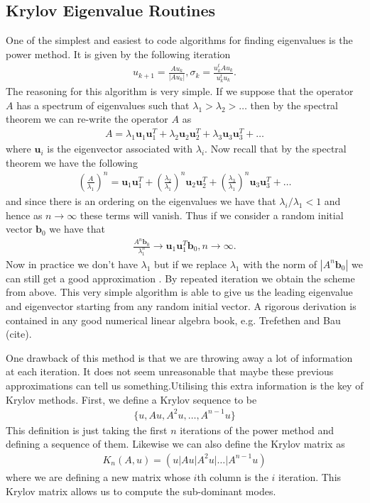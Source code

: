 \subsection{Krylov Eigenvalue Routines}
One of the simplest and easiest to code algorithms for finding eigenvalues is the power method. It is given by the following iteration \cite{MeyerLinAlg}
\begin{align}
u_{k+1}=\frac{Au_{k}}{|Au_{k}|}, \sigma_{k}=\frac{u_{k}^{t}Au_{k}}{u_{k}^{t}u_{k}}.
\end{align}
The reasoning for this algorithm is very simple. If we suppose that the operator $A$ has a spectrum of eigenvalues such that $\lambda_{1} > \lambda_{2} > \ldots $ then by the spectral theorem we can re-write the operator $A$ as
\begin{align}
A = \lambda_{1}\bm{u}_{1}\bm{u}_{1}^{T} + \lambda_{2}\bm{u}_{2}\bm{u}_{2}^{T} + \lambda_{3}\bm{u}_{3}\bm{u}_{3}^{T} + \ldots 
\end{align} 
where $\bm{u}_{i}$ is the eigenvector associated with $\lambda_{i}$. Now recall that by the spectral theorem we have the following \cite{MeyerLinAlg}
\begin{align}
\left(\frac{A}{\lambda_{1}}\right)^{n} = \bm{u}_{1}\bm{u}_{1}^{T} + \left(\frac{\lambda_{2}}{\lambda_{1}}\right)^{n}\bm{u}_{2}\bm{u}_{2}^{T} + \left(\frac{\lambda_{3}}{\lambda_{1}}\right)^{n}\bm{u}_{3}\bm{u}_{3}^{T} + \ldots 
\end{align}
and since there is an ordering on the eigenvalues we have that $\lambda_{i}/\lambda_{1}<1$ and hence as $n\rightarrow\infty$ these terms will vanish. Thus if we consider a random initial vector $\bm{b}_{0}$ we have that 
\begin{align}
\frac{A^{n}\bm{b}_{0}}{\lambda_{1}^{n}}\rightarrow \bm{u}_{1}\bm{u}_{1}^{T}\bm{b}_{0}, n\rightarrow\infty.
\end{align}
Now in practice we don't have $\lambda_{1}$ but if we replace $\lambda_{1}$ with the norm of $|A^{n}\bm{b}_{0}|$ we can still get a good approximation \cite{MeyerLinAlg}. By repeated iteration we obtain the scheme from above. This very simple algorithm is able to give us the leading eigenvalue and eigenvector starting from any random initial vector. A rigorous derivation is contained in any good numerical linear algebra book, e.g. Trefethen and Bau (cite). 

One drawback of this method is that we are throwing away a lot of information at each iteration. It does not seem unreasonable that maybe these previous approximations can tell us something.Utilising this extra information is the key of Krylov methods. First, we define a Krylov sequence to be 
\begin{align}
\{u,Au,A^{2}u,\ldots,A^{n-1}u\}
\end{align}
This definition is just taking the first $n$ iterations of the power method and defining a sequence of them. Likewise we can also define the Krylov matrix as 
\begin{align}
K_{n}(A,u)=(u|Au|A^{2}u|\ldots|A^{n-1}u)
\end{align}
where we are defining a new matrix whose $i$th column is the $i$ iteration. This Krylov matrix allows us to compute the sub-dominant modes.  

